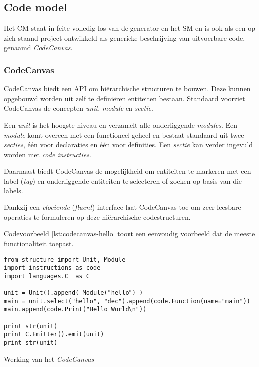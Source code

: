 
\subsection{Code model}
\label{subsection:devel-code-model}

Het CM staat in feite volledig los van de generator en het SM en is ook als een
op zich staand project ontwikkeld als generieke beschrijving van uitvoerbare
code, genaamd \emph{CodeCanvas}.

\subsubsection{CodeCanvas}

CodeCanvas biedt een API om hi\"erarchische structuren te bouwen. Deze kunnen
opgebouwd worden uit zelf te defini\"eren entiteiten bestaan. Standaard
voorziet CodeCanvas de concepten \emph{unit}, \emph{module} en \emph{sectie}.

Een \emph{unit} is het hoogste niveau en verzamelt alle onderliggende
\emph{modules}. Een \emph{module} komt overeen met een functioneel geheel en
bestaat standaard uit twee \emph{secties}, \'e\'en voor declaraties en \'e\'en
voor definities. Een \emph{sectie} kan verder ingevuld worden met \emph{code
instructies}.

Daarnaast biedt CodeCanvas de mogelijkheid om entiteiten te markeren met een
label (\emph{tag}) en onderliggende entiteiten te selecteren of zoeken
op basis van die labels.

Dankzij een \emph{vloeiende} (\emph{fluent}) interface laat CodeCanvas
toe om zeer leesbare operaties te formuleren op deze hi\"erarchische
codestructuren.

Codevoorbeeld \ref{lst:codecanvas-hello} toont een eenvoudig voorbeeld dat de
meeste functionaliteit toepast. 

\begin{listing}[ht]
  \begin{verbatim}
from structure import Unit, Module
import instructions as code
import languages.C  as C

unit = Unit().append( Module("hello") )
main = unit.select("hello", "dec").append(code.Function(name="main"))
main.append(code.Print("Hello World\n"))

print str(unit)
print C.Emitter().emit(unit)
print str(unit)
  \end{verbatim}
  \vspace{-5mm}
  \caption{Werking van het \emph{CodeCanvas}}
  \label{lst:codecanvas-hello}
\end{listing}

